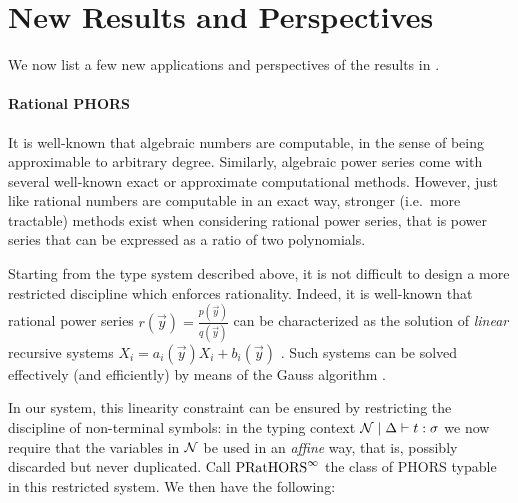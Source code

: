 \documentclass{easychair}
\begin{document}
\section{New Results and Perspectives}
We now list a few new applications and perspectives of the results in \cite{lago2026higherorderprobabilisticverificationweighted}. 

\paragraph{Rational PHORS}

It is well-known that algebraic numbers are computable, in the sense of being approximable to arbitrary degree. 
Similarly, algebraic power series come with several well-known exact or approximate computational methods. 
However, just like rational numbers are computable in an exact way, stronger (i.e.~more tractable) methods exist when considering rational power series, that is power series that can be expressed as a ratio of two polynomials.

Starting from the type system described above, it is not difficult to design a more restricted discipline which enforces rationality. Indeed, it is well-known that rational power series $r(\vec y)=\frac{p(\vec y)}{q(\vec y)}$ can be characterized as the solution of \emph{linear} recursive systems $X_i= a_i(\vec y)X_i+ b_i(\vec y)$ \cite{DBLP:books/sp/KuichS86}. 
Such systems can be solved effectively (and efficiently) by means of the Gauss algorithm \cite{LEHMANN197759}. 

In our system, this linearity constraint can be ensured by restricting the discipline of non-terminal symbols: 
in the typing context $\mathcal{N}\mid\Delta\vdash t:\sigma$ we now require that the variables in $\mathcal{N}$ be used in an \emph{affine} way, that is, possibly discarded but never duplicated. 
Call $\text{PRatHORS}^{\infty}$ the class of PHORS typable in this restricted system. We then have the following:
\end{document}
